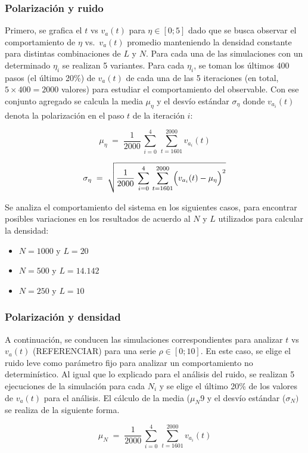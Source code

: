 \documentclass{article}
\begin{document}
\subsubsection{Polarización y ruido}
Primero, se grafica el \(t\) vs \(v_a(t)\) para \(\eta \in [0;5]\) dado que se busca observar el comportamiento de \( \eta \) vs.\ \( v_a(t) \) promedio manteniendo la densidad constante para distintas combinaciones de \( L \) y \( N \).  Para cada una de las simulaciones con un determinado \(\eta_i\) se realizan 5 variantes. Para cada \(\eta_i\), se toman los últimos 400 pasos (el último 20\%) de \(v_a(t)\) de cada una de las 5 iteraciones (en total, \(5\times 400=2000\) valores) para estudiar el comportamiento del observable. Con ese conjunto agregado se calcula la media \(\mu_\eta\) y el desvío estándar \(\sigma_\eta\) donde \(v_{a_i}(t)\) denota la polarización en el paso \(t\) de la iteración \(i\):

\[
\mu_{\eta} \;=\; \frac{1}{2000}\,\sum_{i=0}^{4}\,\sum_{t=1601}^{2000} v_{a_i}(t)
\]

\[
\sigma_{\eta} \;=\; \sqrt{\frac{1}{2000}\,\sum_{i=0}^{4}\,\sum_{t=1601}^{2000}\Bigl(v_{a_i}(t)-\mu_{\eta}\Bigr)^2}
\]


Se analiza el comportamiento del sistema en los siguientes casos, para encontrar posibles variaciones en los resultados de acuerdo al \(N\) y \(L\) utilizados para calcular la densidad:
\begin{itemize}
    \item \(N=1000\) y \(L=20\) 
    \item \(N=500\) y \(L=14.142\)
    \item \(N=250\) y \(L=10\)
\end{itemize}

\subsubsection{Polarización y densidad}
A continuación, se conducen las simulaciones correspondientes para analizar   \(t\) vs \(v_a(t)\) (REFERENCIAR) para una serie  \(\rho\in [0;10]\). En este caso, se elige el ruido leve como parámetro fijo para analizar un comportamiento no determinístico.
Al igual que lo explicado para el análisis del ruido, se realizan 5 ejecuciones de la simulación para cada \(N_i\) y se elige el último 20\% de los valores de \(v_a(t)\) para el análisis. El cálculo de la media (\(\mu_N\)9 y el desvío estándar (\(\sigma_N)\) se realiza de la siguiente forma.

\[
\mu_{N} \;=\; \frac{1}{2000}\,\sum_{i=0}^{4}\,\sum_{t=1601}^{2000} v_{a_i}(t)
\]
\end{document}
